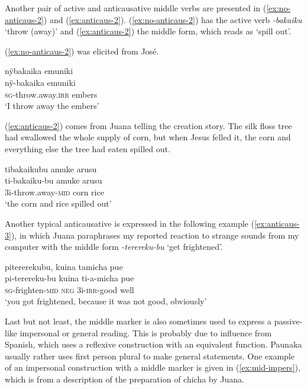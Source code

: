 Another pair of active and anticausative middle verbs are presented in (\ref{ex:no-anticaus-2}) and (\ref{ex:anticaus-2}). (\ref{ex:no-anticaus-2}) has the active verb \textit{-bakaiku} ‘throw (away)’ and (\ref{ex:anticaus-2}) the middle form, which reads as ‘spill out’.

(\ref{ex:no-anticaus-2}) was elicited from José.

\ea\label{ex:no-anticaus-2}
\begingl 
\glpreamble nÿbakaika emuniki\\
\gla nÿ-bakaika emuniki\\ 
\textsc{sg}-throw.away.\textsc{irr} embers\\ 
\glft ‘I throw away the embers’
 \trailingcitation{[oxx-e120414ls-1a.003]}%
\xe

(\ref{ex:anticaus-2}) comes from Juana telling the creation story. The silk floss tree had swallowed the whole supply of corn, but when Jesus felled it, the corn and everything else the tree had eaten spilled out.

\ea\label{ex:anticaus-2}
\begingl 
\glpreamble tibakaikubu amuke arusu\\
\gla ti-bakaiku-bu amuke arusu\\ 
\glb 3i-throw.away-\textsc{mid} corn rice\\ 
\glft ‘the corn and rice spilled out’
 \trailingcitation{[jxx-n101013s-1.830]}
\xe

Another typical anticausative is expressed in the following example (\ref{ex:anticaus-3}), in which Juana paraphrases my reported reaction to strange sounds from my computer with the middle form \textit{-terereku-bu} ‘get frightened’.

\ea\label{ex:anticaus-3}
\begingl 
\glpreamble pitererekubu, kuina tamicha pue\\
\gla pi-terereku-bu kuina ti-a-micha pue\\ 
\textsc{sg}-frighten-\textsc{mid} \textsc{neg} 3i-\textsc{irr}-good well\\ 
\glft ‘you got frightened, because it was not good, obviously’
 \trailingcitation{[jxx-p120430l-1.007]}
\xe{}

Last but not least, the middle marker is also sometimes used to express a passive-like impersonal or general reading. This is probably due to influence from Spanish, which uses a reflexive construction with an equivalent function. Paunaka usually rather uses first person plural to make general statements. One example of an impersonal construction with a middle marker is given in (\ref{ex:mid-impers}), which is from a description of the preparation of chicha by Juana.


